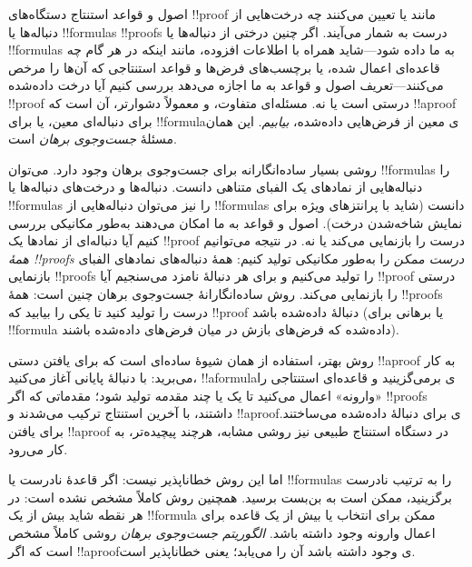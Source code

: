 \documentclass[../../../include/open-logic-section]{subfiles}
\begin{document}


اصول و قواعد استنتاج دستگاه‌های !!{proof} مانند  یا
 تعیین می‌کنند چه درخت‌هایی از دنباله‌ها یا !!{formula}s
!!{proof}s درست به شمار می‌آیند. اگر چنین درختی از دنباله‌ها یا
!!{formula}s به ما داده شود---شاید همراه با اطلاعات افزوده، مانند
اینکه در هر گام چه قاعده‌ای اعمال شده، یا برچسب‌های فرض‌ها و قواعد
استنتاجی که آن‌ها را مرخص می‌کنند---تعریف اصول و قواعد به ما اجازه
می‌دهد بررسی کنیم آیا درخت داده‌شده !!{proof} درستی است یا نه. مسئله‌ای
متفاوت، و معمولاً دشوارتر، آن است که !!a{proof} برای دنباله‌ای معین، یا
برای !!{formula}ی معین از فرض‌هایی داده‌شده، \emph{بیابیم}.
این همان مسئلهٔ \emph{جست‌وجوی برهان} است.

روشی بسیار ساده‌انگارانه برای جست‌وجوی برهان وجود دارد. می‌توان
!!{formula}s را دنباله‌هایی از نمادهای یک الفبای متناهی دانست.
دنباله‌ها و درخت‌های دنباله‌ها یا !!{formula}s را نیز می‌توان
دنباله‌هایی از !!{formula}s دانست (شاید با پرانتزهای ویژه برای نمایش
شاخه‌شدن درخت). اصول و قواعد به ما امکان می‌دهند به‌طور مکانیکی بررسی
کنیم آیا دنباله‌ای از نمادها یک !!{proof} درست را بازنمایی می‌کند یا
نه. در نتیجه می‌توانیم \emph{همهٔ !!{proof}s درست ممکن} را به‌طور
مکانیکی تولید کنیم: همهٔ دنباله‌های نمادهای الفبای بازنمایی
!!{proof}s را تولید می‌کنیم و برای هر دنبالهٔ نامزد می‌سنجیم آیا
!!{proof} درستی را بازنمایی می‌کند. روش ساده‌انگارانهٔ جست‌وجوی برهان
چنین است: همهٔ !!{proof}s درست را تولید کنید تا یکی را بیابید که
!!{proof} دنبالهٔ داده‌شده باشد (یا برهانی برای !!{formula}
داده‌شده که فرض‌های بازش در میان فرض‌های داده‌شده باشند).

روش بهتر، استفاده از همان شیوهٔ ساده‌ای است که برای یافتن دستی
!!a{proof} به کار می‌برید: با دنبالهٔ پایانی آغاز می‌کنید،
!!a{formula}ی برمی‌گزینید و قاعده‌ای استنتاجی را «وارونه» اعمال
می‌کنید تا یک یا چند مقدمه تولید شود؛ مقدماتی که اگر !!{proof}s داشتند،
با آخرین استنتاج ترکیب می‌شدند و !!a{proof}ی برای دنبالهٔ داده‌شده
می‌ساختند. برای یافتن !!a{proof} در دستگاه استنتاج طبیعی نیز روشی
مشابه، هرچند پیچیده‌تر، به کار می‌رود.

اما این روش خطاناپذیر نیست: اگر قاعدهٔ نادرست یا !!{formula}s را به
ترتیب نادرست برگزینید، ممکن است به بن‌بست برسید. همچنین روش کاملاً
مشخص نشده است: در هر نقطه شاید بیش از یک !!{formula} ممکن برای انتخاب
یا بیش از یک قاعده برای اعمال وارونه وجود داشته باشد. \emph{الگوریتم
جست‌وجوی برهان} روشی کاملاً مشخص است که اگر !!a{proof}ی وجود داشته
باشد آن را می‌یابد؛ یعنی خطاناپذیر است.
\end{document}
